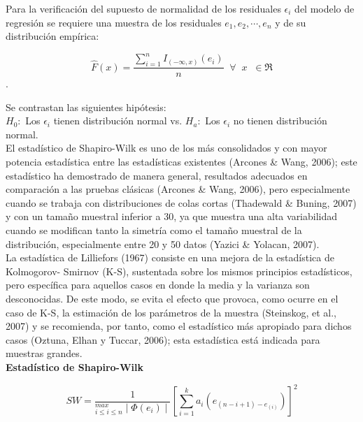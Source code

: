 Para la verificación del supuesto de normalidad de los residuales $\epsilon_i$ del modelo de regresión se requiere una muestra de los residuales $e_1, e_2, \cdots, e_n$ y de su distribución empírica:\\


\begin{center}
	$$\hat{F}(x)=\frac{\sum_{i=1}^n I_{(- \infty,x)}(e_i)}{n}  \;\; \forall \;\; x \;\; \in \Re$$.
\end{center}

Se contrastan las siguientes hipótesis:\\

$H_0:$ Los $\epsilon_i$ tienen distribución normal vs. $H_a:$ Los $\epsilon_i$ no tienen distribución normal.\\

El estadístico de Shapiro-Wilk es uno de los más consolidados y con mayor potencia estadística entre las estadísticas existentes (Arcones \& Wang, 2006); este estadístico ha demostrado de manera general, resultados adecuados en comparación a las pruebas clásicas (Arcones \& Wang, 2006), pero especialmente cuando se trabaja con distribuciones de colas cortas (Thadewald \& Buning, 2007) y con un tamaño muestral inferior a 30, ya que muestra una alta variabilidad cuando se modifican tanto la simetría como el tamaño muestral de la distribución, especialmente entre 20 y 50 datos (Yazici \& Yolacan, 2007).\\

La estadística de Lilliefors (1967) consiste en una mejora de la estadística de Kolmogorov- Smirnov (K-S), sustentada sobre los mismos principios estadísticos, pero específica para aquellos casos en donde la media y la varianza son desconocidas. De este modo, se evita el efecto que provoca, como ocurre en el caso de K-S, la estimación de los parámetros de la muestra (Steinskog, et al., 2007) y se recomienda, por tanto, como el estadístico más apropiado para dichos casos (Oztuna, Elhan y Tuccar, 2006); esta estadística está indicada para muestras grandes.\\


\textbf{Estadístico de Shapiro-Wilk}


\begin{center}
 $$SW=\frac{1}{^{max}_{i\leq i \leq n} \mid \Phi (e_i) \mid}[\sum_{i=1}^k a_i(e_{(n-i+1)-e_(i)})]^2$$
\end{center}


